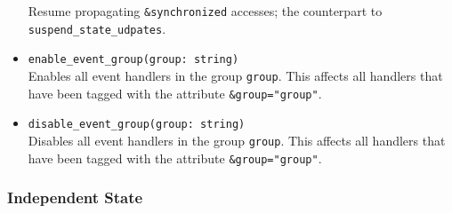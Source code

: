 \documentclass[10pt,landscape]{article}
\begin{document}
\begin{multicols*}{2}
\begin{itemize}
    Resume propagating \verb|&synchronized| accesses; the counterpart to
    \verb|suspend_state_udpates|.
  \item \verb|enable_event_group(group: string)|\\
    Enables all event handlers in the group \verb|group|. This affects all
    handlers that have been tagged with the attribute \verb|&group="group"|.
  \item \verb|disable_event_group(group: string)|\\
    Disables all event handlers in the group \verb|group|. This affects all
    handlers that have been tagged with the attribute \verb|&group="group"|.
\end{itemize}

\subsubsection*{Independent State}


\end{multicols*}
\end{document}
